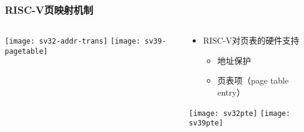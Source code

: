 \begin{frame}   
	\frametitle{RISC-V页映射机制}
	
	\begin{columns}
		
		\begin{column}{.5\textwidth}
			\centering
			\texttt{[image: sv32-addr-trans]}
			\texttt{[image: sv39-pagetable]}
			
		\end{column}
		
		
		\begin{column}{.5\textwidth}
			
			\begin{itemize}\large
				\item RISC-V对页表的硬件支持
				\begin{itemize}
					\item 地址保护
					\item 页表项（page table entry）
					
				\end{itemize}
			\end{itemize}
			\texttt{[image: sv32pte]}
			\texttt{[image: sv39pte]}

		\end{column}
		
		
	\end{columns}
	
\end{frame}



